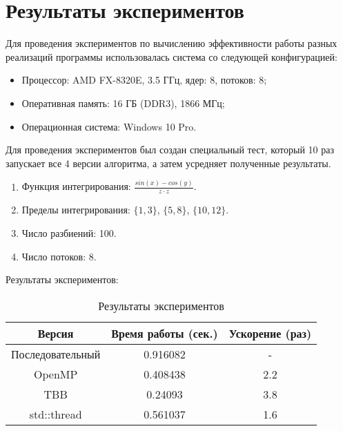 \documentclass{report}
\begin{document}
\section*{Результаты экспериментов}
Для проведения экспериментов по вычислению эффективности работы разных реализаций программы использовалась система со следующей конфигурацией:
\begin{itemize}
\item Процессор: AMD FX-8320E, 3.5 ГГц, ядер: 8, потоков: 8;
\item Оперативная память: 16 ГБ (DDR3), 1866 МГц;
\item Операционная система: Windows 10 Pro.
\end{itemize}

\par Для проведения экспериментов был создан специальный тест, который 10 раз запускает все 4 версии алгоритма, а затем усредняет полученные результаты.  
\begin{enumerate}
    \item Функция интегрирования: $\frac{sin(x) - cos(y)}{z \cdot z}$.
    \item Пределы интегрирования: $\{1, 3\}$, $\{5, 8\}$, $\{10, 12\}$.
    \item Число разбиений: 100.
    \item Число потоков: 8.
\end{enumerate}

\par Результаты экспериментов:
\begin{table}[!h]
\centering
\begin{tabular}{| c | c | c |}
\hline
Версия & Время работы (сек.) & Ускорение (раз) \\
\hline
Последовательный        & 0.916082        & -         \\
OpenMP        & 0.408438        & 2.2          \\
TBB       & 0.24093        & 3.8         \\
std::thread        & 0.561037        & 1.6           \\
\hline
\end{tabular}
\caption{Результаты экспериментов}
\end{table}

\newpage

\end{document}
